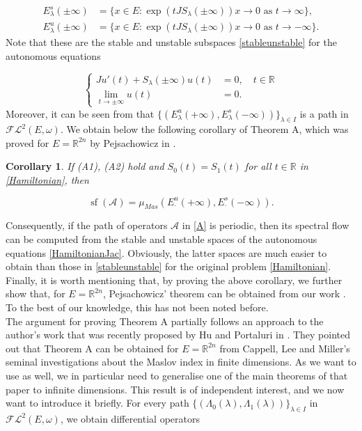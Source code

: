 \documentclass[a4paper,10pt]{article}
\newtheorem*{corA}{Corollary}
\DeclareMathOperator{\sfl}{sf}
\begin{document}
\begin{align*}
E^s_\lambda(\pm\infty)&=\{x\in E: \exp(tJS_\lambda(\pm\infty))x\rightarrow 0\,\,\text{as}\,\, t\rightarrow\infty\},\\
E^u_\lambda(\pm\infty)&=\{x\in E: \exp(tJS_\lambda(\pm\infty))x\rightarrow 0\,\,\text{as}\,\, t\rightarrow-\infty\}.
\end{align*}
Note that these are the stable and unstable subspaces \eqref{stableunstable} for the autonomous equations

\begin{equation}\label{HamiltonianJac}
\left\{
\begin{aligned}
Ju'(t)+S_\lambda(\pm\infty)u(t)&=0,\quad t\in\mathbb{R}\\
\lim_{t\rightarrow\pm\infty}u(t)&=0.
\end{aligned}
\right.
\end{equation}
Moreover, it can be seen from \cite{AlbertoODE} that $\{(E^u_\lambda(+\infty), E^s_\lambda(-\infty))\}_{\lambda\in I}$ is a path in $\mathcal{FL}^2(E,\omega)$. We obtain below the following corollary of Theorem A, which was proved for $E=\mathbb{R}^{2n}$ by Pejsachowicz in \cite{Jacobo}.

\begin{corA}
If (A1), (A2) hold and $S_0(t)=S_1(t)$ for all $t\in\mathbb{R}$ in \eqref{Hamiltonian}, then 

\[\sfl(\mathcal{A})=\mu_{Mas}(E^u_\cdot(+\infty),E^s_\cdot(-\infty)).\] 
\end{corA}
\noindent
Consequently, if the path of operators $\mathcal{A}$ in \eqref{A} is periodic, then its spectral flow can be computed from the stable and unstable spaces of the autonomous equations \eqref{HamiltonianJac}. Obviously, the latter spaces are much easier to obtain than those in  \eqref{stableunstable} for the original problem \eqref{Hamiltonian}. Finally, it is worth mentioning that, by proving the above corollary, we further show that, for $E=\mathbb{R}^{2n}$, Pejsachowicz' theorem \cite{Jacobo} can be obtained from our work \cite{WaterstraatHomoclinics}. To the best of our knowledge, this has not been noted before.\\     
The argument for proving Theorem A partially follows an approach to the author's work \cite{WaterstraatHomoclinics} that was recently proposed by Hu and Portaluri in \cite{Hu}. They pointed out that Theorem A can be obtained for $E=\mathbb{R}^{2n}$ from Cappell, Lee and Miller's seminal investigations about the Maslov index \cite{Cappell} in finite dimensions. As we want to use \cite{Cappell} as well, we in particular need to generalise one of the main theorems of that paper to infinite dimensions. This result is of independent interest, and we now want to introduce it briefly. For every path $\{(\Lambda_0(\lambda),\Lambda_1(\lambda))\}_{\lambda\in I}$ in $\mathcal{FL}^2(E,\omega)$, we obtain differential operators
\end{document}
